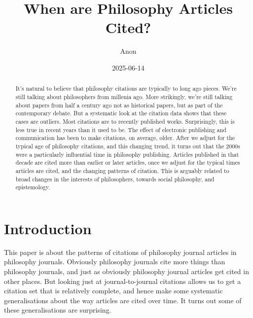 \documentclass[
  12pt,
  letterpaper,
  DIV=11,
  numbers=noendperiod]{scrartcl}
\title{When are Philosophy Articles Cited?}
\author{Anon}
\date{2025-06-14}
\begin{document}
\maketitle
\begin{abstract}
It's natural to believe that philosophy citations are typically to long
ago pieces. We're still talking about philosophers from millenia ago.
More strikingly, we're still talking about papers from half a century
ago not as historical papers, but as part of the contemporary debate.
But a systematic look at the citation data shows that these cases are
outliers. Most citations are to recently published works. Surprisingly,
this is less true in recent years than it used to be. The effect of
electronic publishing and communication has been to make citations, on
average, older. After we adjust for the typical age of philosophy
citations, and this changing trend, it turns out that the 2000s were a
particularly influential time in philosophy publishing. Articles
published in that decade are cited more than earlier or later articles,
once we adjust for the typical times articles are cited, and the
changing patterns of citation. This is arguably related to broad changes
in the interests of philosophers, towards social philosophy, and
epistemology.
\end{abstract}


\section{Introduction}\label{sec-introduction}

This paper is about the patterns of citations of philosophy journal
articles in philosophy journals. Obviously philosophy journals cite more
things than philosophy journals, and just as obviously philosophy
journal articles get cited in other places. But looking just at
journal-to-journal citations allows us to get a citation set that is
relatively complete, and hence make some systematic generalisations
about the way articles are cited over time. It turns out some of these
generalisations are surprising.
\end{document}
